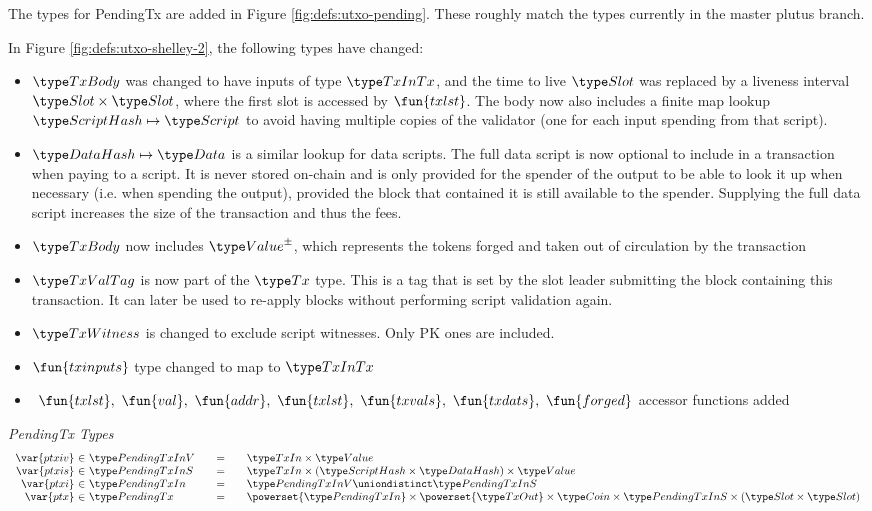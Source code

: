 The types for PendingTx are added in Figure \ref{fig:defs:utxo-pending}.
These roughly match the types currently in the master plutus branch.

In Figure \ref{fig:defs:utxo-shelley-2}, the following types have changed:

\begin{itemize}
  \item $\TxBody$ was changed to have inputs of type $\TxInTx$, and the
  time to live $\Slot$ was replaced by a liveness interval $\Slot \times \Slot$,
  where the first slot is accessed by $\fun{txlst}$. The body now also includes
  a finite map lookup $\HashScr \mapsto \Script$ to avoid having multiple
  copies of the validator (one for each input spending from that script).
  \item $\HashDat \mapsto \Data$ is a similar lookup for data scripts.
  The full data script is now optional to include in a transaction when
  paying to a script. It is never
  stored on-chain and is only provided for the spender of the output
  to be able to look it up when necessary (i.e. when spending the output),
  provided the block that contained it is still available to the spender.
  Supplying the full data script increases the size of the transaction and
  thus the fees.
  \item $\TxBody$ now includes $\ValuePM$, which represents
  the tokens forged and taken out of circulation by the transaction
  \item $\TxValTag$ is now part of the $\Tx$ type. This is a tag that is
  set by the slot leader submitting the block containing this transaction.
  It can later be used to re-apply blocks without performing script validation
  again.
  \item $\TxWitness$ is changed to exclude script witnesses. Only PK ones
  are included.
  \item $\fun{txinputs}$ type changed to map to $\TxInTx$
  \item $~\fun{txlst},~\fun{val},~\fun{addr},~\fun{txlst},~\fun{txvals},~\fun{txdats},
  ~\fun{forged}$
  accessor functions added
\end{itemize}


\begin{figure*}[htb]
  \emph{PendingTx Types}
  \begin{equation*}
    \begin{array}{r@{~\in~}l@{\qquad=\qquad}l}
      \var{ptxiv}
      & \PendingTxInV
      & \TxIn \times \Value
      \\
      \var{ptxis}
      & \PendingTxInS
      & \TxIn \times (\HashScr \times \HashDat) \times \Value
      \\
      \var{ptxi}
      & \PendingTxIn
      & \PendingTxInV \uniondistinct \PendingTxInS
      \\
      \var{ptx}
      & \PendingTx
      & \powerset{\PendingTxIn} \times  \powerset{\TxOut} \times \Coin \times
      \PendingTxInS \times (\Slot\times\Slot)
      \\
    \end{array}
  \end{equation*}
  \caption{Definitions used to make PendingTx}
  \label{fig:defs:utxo-pending}
\end{figure*}

